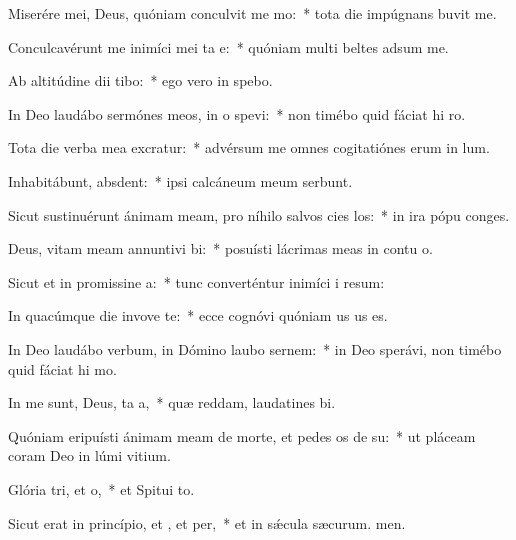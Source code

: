 \item Miserére mei, Deus, quóniam conculvit me mo:~* tota die impúgnans buvit me.
\item Conculcavérunt me inimíci mei ta e:~* quóniam multi beltes adsum me.
\item Ab altitúdine dii tibo:~* ego vero in  spebo.
\item In Deo laudábo sermónes meos, in o spevi:~* non timébo quid fáciat hi ro.
\item Tota die verba mea excratur:~* advérsum me omnes cogitatiónes erum in lum.
\item Inhabitábunt,  absdent:~* ipsi calcáneum meum serbunt.
\item Sicut sustinuérunt ánimam meam, pro níhilo salvos cies los:~* in ira pópu conges.
\item Deus, vitam meam annuntivi bi:~* posuísti lácrimas meas in contu o.
\item Sicut et in promissine a:~* tunc converténtur inimíci i resum:
\item In quacúmque die invove te:~* ecce cognóvi quóniam us us es.
\item In Deo laudábo verbum, in Dómino laubo sernem:~* in Deo sperávi, non timébo quid fáciat hi mo.
\item In me sunt, Deus, ta a,~* quæ reddam, laudatines bi.
\item Quóniam eripuísti ánimam meam de morte, et pedes os de su:~* ut pláceam coram Deo in lúmi vitium.
\item Glória tri, et o,~* et Spitui to.
\item Sicut erat in princípio, et , et per,~* et in sǽcula sæcurum. men.
